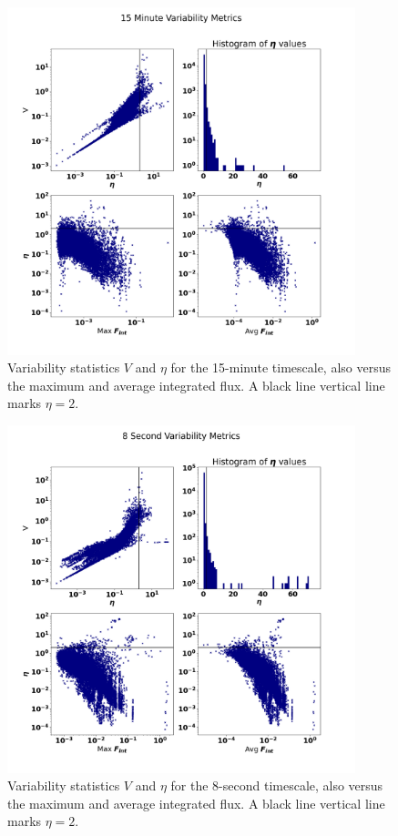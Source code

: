 \documentclass[12pt]{article}
\begin{document}
\begin{figure}
	\includegraphics[width=0.9\textwidth]{15_Minute_Variability_Metrics.png}
	\caption{Variability statistics $V$ and $\eta$ for the 15-minute timescale, also versus the maximum and average integrated flux. A black line vertical line marks $\eta=2$.}
	\label{fig:varstat15min}
\end{figure}

\begin{figure}
	\includegraphics[width=0.9\textwidth]{8_Second_Variability_Metrics.png}
	\caption{Variability statistics $V$ and $\eta$ for the 8-second timescale, also versus the maximum and average integrated flux. A black line vertical line marks $\eta=2$.}
	\label{fig:varstat8sec}
\end{figure}
\end{document}
